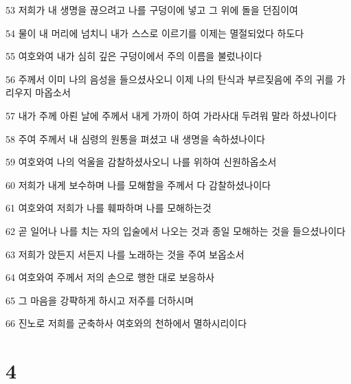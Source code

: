 \par 53 저희가 내 생명을 끊으려고 나를 구덩이에 넣고 그 위에 돌을 던짐이여
\par 54 물이 내 머리에 넘치니 내가 스스로 이르기를 이제는 멸절되었다 하도다
\par 55 여호와여 내가 심히 깊은 구덩이에서 주의 이름을 불렀나이다
\par 56 주께서 이미 나의 음성을 들으셨사오니 이제 나의 탄식과 부르짖음에 주의 귀를 가리우지 마옵소서
\par 57 내가 주께 아뢴 날에 주께서 내게 가까이 하여 가라사대 두려워 말라 하셨나이다
\par 58 주여 주께서 내 심령의 원통을 펴셨고 내 생명을 속하셨나이다
\par 59 여호와여 나의 억울을 감찰하셨사오니 나를 위하여 신원하옵소서
\par 60 저희가 내게 보수하며 나를 모해함을 주께서 다 감찰하셨나이다
\par 61 여호와여 저희가 나를 훼파하며 나를 모해하는것
\par 62 곧 일어나 나를 치는 자의 입술에서 나오는 것과 종일 모해하는 것을 들으셨나이다
\par 63 저희가 앉든지 서든지 나를 노래하는 것을 주여 보옵소서
\par 64 여호와여 주께서 저의 손으로 행한 대로 보응하사
\par 65 그 마음을 강퍅하게 하시고 저주를 더하시며
\par 66 진노로 저희를 군축하사 여호와의 천하에서 멸하시리이다

\chapter{4}

